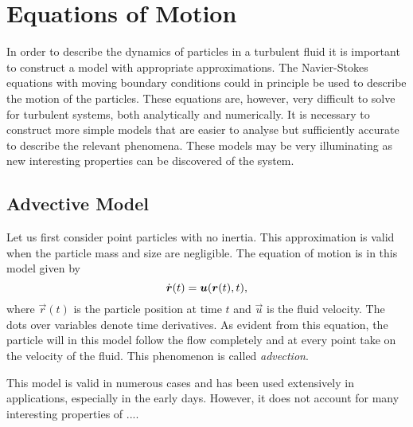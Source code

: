 \section{Equations of Motion}

In order to describe the dynamics of particles in a turbulent fluid it is important to construct a model with appropriate approximations. The Navier-Stokes equations with moving boundary conditions could in principle be used to describe the motion of the particles. These equations are, however, very difficult to solve for turbulent systems, both analytically and numerically. It is necessary to construct more simple models that are easier to analyse but sufficiently accurate to describe the relevant phenomena. These models may be very illuminating as new interesting properties can be discovered of the system. 




\subsection{Advective Model}

Let us first consider point particles with no inertia. This approximation is valid when the particle mass and size are negligible. The equation of motion is in this model given by
\begin{equation}
\dvec{r}(t) = \vec u(\vec{r}(t),t),
\eqlbl{inertialess}
\end{equation}
where $\vec r (t)$ is the particle position at time $t$ and $\vec u $ is the fluid velocity. The dots over variables denote time derivatives. As evident from this equation, the particle will in this model follow the flow completely and at every point take on the velocity of the fluid. This phenomenon is called \emph{advection}.

This model is valid in numerous cases and has been used extensively in applications, especially in the early days. However, it does not account for many interesting properties of ....


